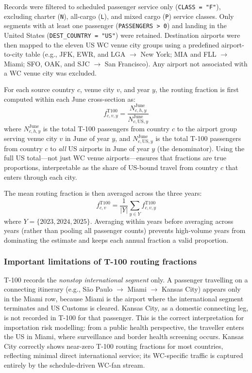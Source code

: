 \documentclass[12pt]{article}
\begin{document}
Records were filtered to scheduled passenger service only
(\texttt{CLASS = "F"}), excluding charter (\texttt{N}),
all-cargo (\texttt{L}), and mixed cargo (\texttt{P}) service
classes. Only segments with at least one passenger (\texttt{PASSENGERS > 0})
and landing in the United States (\texttt{DEST\_COUNTRY = "US"}) were
retained. Destination airports were then mapped to the eleven US
WC venue city groups using a predefined airport-to-city table (e.g.,
JFK, EWR, and LGA $\to$ New York; MIA and FLL $\to$ Miami;
SFO, OAK, and SJC $\to$ San Francisco). Any airport not associated
with a WC venue city was excluded.

For each source country $c$, venue city $v$, and year $y$, the
routing fraction is first computed within each June cross-section
as:
\begin{equation}
  f_{c,v,y}^{\text{T100}} =
    \frac{N_{c,h,y}^{\text{June}}}
         {N_{c,\text{US},y}^{\text{June}}}
\end{equation}
where $N_{c,h,y}^{\text{June}}$ is the total T-100 passengers from
country $c$ to the airport group serving venue city $v$ in June of
year $y$, and $N_{c,\text{US},y}^{\text{June}}$ is the total T-100
passengers from country $c$ to \emph{all} US airports in June of
year $y$ (the denominator). Using the full US total---not just WC
venue airports---ensures that fractions are true proportions,
interpretable as the share of US-bound travel from country $c$ that
enters through each city.

The mean routing fraction is then averaged across the three years:
\begin{equation}
  f_{c,v}^{\text{T100}} = \frac{1}{|Y|}
    \sum_{y \in Y} f_{c,v,y}^{\text{T100}}
  \label{eq:t100_routing}
\end{equation}
where $Y = \{2023, 2024, 2025\}$. Averaging within years before
averaging across years (rather than pooling all passenger counts)
prevents high-volume years from dominating the estimate and keeps
each annual fraction a valid proportion.

\subsubsection*{Important limitations of T-100 routing fractions}

T-100 records the \emph{nonstop international segment} only. A
passenger travelling on a connecting itinerary (e.g., São Paulo
$\to$ Miami $\to$ Kansas City) appears only in the Miami row, because
Miami is the airport where the international segment terminates and US
Customs is cleared. Kansas City, as a domestic connecting leg, is not
recorded in T-100 for that passenger. This is the correct
interpretation for importation risk modelling: from a public health
perspective, the traveller enters the US in Miami, where surveillance
and border health screening occurs. Kansas City correctly shows
near-zero T-100 routing fractions for most countries, reflecting
minimal direct international service; its WC-specific traffic is
captured entirely by the schedule-driven WC-fan stream.
\end{document}

